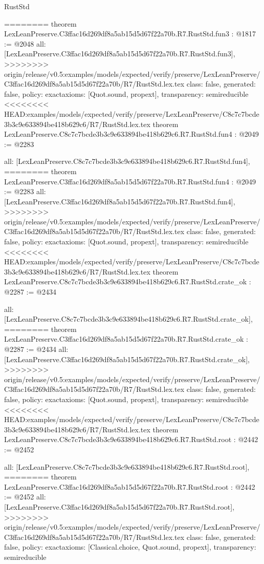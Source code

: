 \begin{lexlean}{RustStd}
\begin{coremodule}
{\begin{coremodule}
{{{{{{========
theorem LexLeanPreserve.C3ffac16d269df8a5ab15d5d67f22a70b.R7.RustStd.fun3 : @1817 := @2048 {
  all: [LexLeanPreserve.C3ffac16d269df8a5ab15d5d67f22a70b.R7.RustStd.fun3],
>>>>>>>> origin/release/v0.5:examples/models/expected/verify/preserve/LexLeanPreserve/C3ffac16d269df8a5ab15d5d67f22a70b/R7/RustStd.lex.tex
  class: false,
  generated: false,
  policy: exact{axioms: [Quot.sound, propext]},
  transparency: semireducible
}
<<<<<<<< HEAD:examples/models/expected/verify/preserve/LexLeanPreserve/C8c7c7bcde3b3c9e633894be418b629c6/R7/RustStd.lex.tex
theorem LexLeanPreserve.C8c7c7bcde3b3c9e633894be418b629c6.R7.RustStd.fun4 : @2049 := @2283 {
  all: [LexLeanPreserve.C8c7c7bcde3b3c9e633894be418b629c6.R7.RustStd.fun4],
========
theorem LexLeanPreserve.C3ffac16d269df8a5ab15d5d67f22a70b.R7.RustStd.fun4 : @2049 := @2283 {
  all: [LexLeanPreserve.C3ffac16d269df8a5ab15d5d67f22a70b.R7.RustStd.fun4],
>>>>>>>> origin/release/v0.5:examples/models/expected/verify/preserve/LexLeanPreserve/C3ffac16d269df8a5ab15d5d67f22a70b/R7/RustStd.lex.tex
  class: false,
  generated: false,
  policy: exact{axioms: [Quot.sound, propext]},
  transparency: semireducible
}
<<<<<<<< HEAD:examples/models/expected/verify/preserve/LexLeanPreserve/C8c7c7bcde3b3c9e633894be418b629c6/R7/RustStd.lex.tex
theorem LexLeanPreserve.C8c7c7bcde3b3c9e633894be418b629c6.R7.RustStd.crate_ok : @2287 := @2434 {
  all: [LexLeanPreserve.C8c7c7bcde3b3c9e633894be418b629c6.R7.RustStd.crate_ok],
========
theorem LexLeanPreserve.C3ffac16d269df8a5ab15d5d67f22a70b.R7.RustStd.crate_ok : @2287 := @2434 {
  all: [LexLeanPreserve.C3ffac16d269df8a5ab15d5d67f22a70b.R7.RustStd.crate_ok],
>>>>>>>> origin/release/v0.5:examples/models/expected/verify/preserve/LexLeanPreserve/C3ffac16d269df8a5ab15d5d67f22a70b/R7/RustStd.lex.tex
  class: false,
  generated: false,
  policy: exact{axioms: [Quot.sound, propext]},
  transparency: semireducible
}
<<<<<<<< HEAD:examples/models/expected/verify/preserve/LexLeanPreserve/C8c7c7bcde3b3c9e633894be418b629c6/R7/RustStd.lex.tex
theorem LexLeanPreserve.C8c7c7bcde3b3c9e633894be418b629c6.R7.RustStd.root : @2442 := @2452 {
  all: [LexLeanPreserve.C8c7c7bcde3b3c9e633894be418b629c6.R7.RustStd.root],
========
theorem LexLeanPreserve.C3ffac16d269df8a5ab15d5d67f22a70b.R7.RustStd.root : @2442 := @2452 {
  all: [LexLeanPreserve.C3ffac16d269df8a5ab15d5d67f22a70b.R7.RustStd.root],
>>>>>>>> origin/release/v0.5:examples/models/expected/verify/preserve/LexLeanPreserve/C3ffac16d269df8a5ab15d5d67f22a70b/R7/RustStd.lex.tex
  class: false,
  generated: false,
  policy: exact{axioms: [Classical.choice, Quot.sound, propext]},
  transparency: semireducible
}

}}}}}}}}}
\end{coremodule}}
\end{coremodule}
\end{lexlean}
